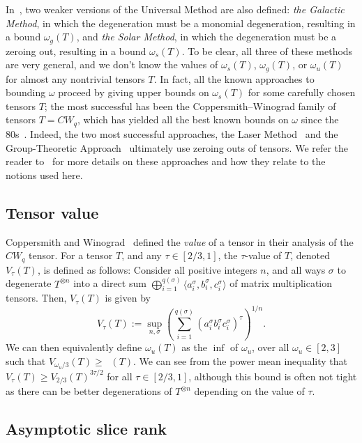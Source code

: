 \documentclass[11pt]{article}
\numberwithin{equation}{section}
\theoremstyle{definition}
\theoremstyle{plain}
\newcommand{\trr}{\mathop{\tilde{\operatorname{R}}}}
\theoremstyle{definition}
\begin{document}
In~\cite{aw}, two weaker versions of the Universal Method are also defined: \emph{the Galactic Method}, in which the degeneration must be a monomial degeneration, resulting in a bound $\omega_g(T)$, and \emph{the Solar Method}, in which the degeneration must be a zeroing out, resulting in a bound $\omega_s(T)$. To be clear, all three of these methods are very general, and we don't know the values of $\omega_s(T)$, $\omega_g(T)$, or $\omega_u(T)$ for almost any nontrivial tensors $T$. In fact, all the known approaches to bounding $\omega$ proceed by giving upper bounds on $\omega_s(T)$ for some carefully chosen tensors $T$; the most successful has been the Coppersmith--Winograd family of tensors $T = CW_q$, which has yielded all the best known bounds on $\omega$ 
%
%
%
since the 80s~\cite{CoppersmithW82,stothers,v12,legall,awrefined}. 
Indeed, the two most successful approaches, the Laser Method~\cite{strassenlaser1} and the Group-Theoretic Approach~\cite{cohn2003group} ultimately use zeroing outs of tensors. We refer the reader to~\cite[Sections 3.3 and 3.4]{aw} for more details on these approaches and how they relate to the notions used here.




%
\subsection{Tensor value} \label{subsec:value}

Coppersmith and Winograd~\cite{coppersmith} defined the \emph{value} of a tensor in their analysis of the $CW_q$ tensor. For a tensor $T$, and any $\tau \in [2/3, 1]$, the $\tau$-value of $T$, denoted $V_\tau(T)$, is defined as follows: Consider all positive integers $n$, and all ways $\sigma$ to degenerate $T^{\otimes n}$ into a direct sum $\bigoplus_{i=1}^{q(\sigma)} \langle a_i^\sigma, b_i^\sigma, c_i^\sigma \rangle$ of matrix multiplication tensors. Then, $V_\tau(T)$ is given by $$V_\tau(T) := \sup_{n, \sigma} \left( \sum_{i=1}^{q(\sigma)} (a_i^\sigma b_i^\sigma c_i^\sigma)^\tau \right)^{1/n}.$$
We can then equivalently define $\omega_u(T)$ as the $\inf$ of $\omega_u$, over all $\omega_u \in [2,3]$ such that $V_{\omega_u / 3}(T) \geq \trr(T)$. We can see from the power mean inequality that $V_\tau(T) \geq V_{2/3}(T)^{3 \tau / 2}$ for all $\tau \in [2/3,1]$, although this bound is often not tight as there can be better degenerations of $T^{\otimes n}$ depending on the value of $\tau$.



%
\subsection{Asymptotic slice rank} \label{sliceranksubsec}
\end{document}

